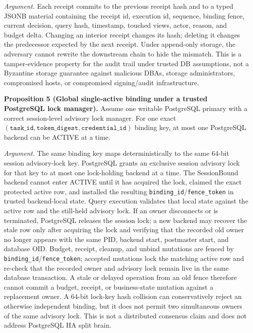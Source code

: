 \documentclass[journal]{IEEEtran}
\begin{document}
\emph{Argument.} Each receipt commits to the previous receipt hash and
to a typed JSONB material containing the receipt id, execution id,
sequence, binding fence, current decision, query hash, timestamp, touched
views, actor, reason, and budget delta.
Changing an interior receipt changes its hash; deleting it changes the
predecessor expected by the next receipt. Under append-only storage, the
adversary cannot rewrite the downstream chain to hide the mismatch.
This is a tamper-evidence property for the audit trail under trusted DB
assumptions, not a Byzantine storage guarantee against malicious DBAs,
storage administrators, compromised hosts, or compromised signing/audit
infrastructure.

\noindent\textbf{Proposition 5 (Global single-active binding under a
trusted PostgreSQL lock manager).}
Assume one writable PostgreSQL primary with a correct session-level
advisory lock manager. For one exact
\((\texttt{task\_id},\texttt{token\_digest},\texttt{credential\_id})\)
binding key, at most one PostgreSQL backend can be ACTIVE at a time.

\emph{Argument.} The same binding key maps deterministically to the same
64-bit session advisory-lock key. PostgreSQL grants an exclusive session
advisory lock for that key to at most one lock-holding backend at a time.
The SessionBound backend cannot enter ACTIVE until it has acquired the
lock, claimed the exact protected active row, and installed the resulting
\texttt{binding\_id}/\texttt{fence\_token} in trusted backend-local
state. Query execution validates that local state against the active row
and the still-held advisory lock. If an owner disconnects or is
terminated, PostgreSQL releases the session lock; a new backend may
recover the stale row only after acquiring the lock and verifying that
the recorded old owner no longer appears with the same PID, backend
start, postmaster start, and database OID. Budget, receipt, cleanup, and
unbind mutations are fenced by \texttt{binding\_id}/\texttt{fence\_token};
accepted mutations lock the matching active row and re-check that the recorded
owner and advisory lock remain live in the same database transaction. A stale
or delayed operation from an old fence therefore cannot commit a budget,
receipt, or business-state mutation against a replacement owner. A 64-bit lock-key hash collision can conservatively reject an
otherwise independent binding, but it does not permit two simultaneous
owners of the same advisory lock. This is not a distributed consensus
claim and does not address PostgreSQL HA split brain.
\end{document}
